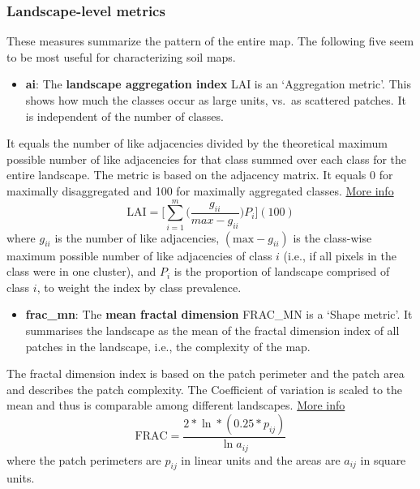 \documentclass[
  letterpaper,
  DIV=11,
  numbers=noendperiod]{scrartcl}
\providecommand{\tightlist}{%
  \setlength{\itemsep}{0pt}\setlength{\parskip}{0pt}}\usepackage{longtable,booktabs,array}
\begin{document}
\hypertarget{landscape-level-metrics}{%
\subsubsection{Landscape-level metrics}\label{landscape-level-metrics}}

These measures summarize the pattern of the entire map. The following
five seem to be most useful for characterizing soil maps.

\begin{itemize}
\tightlist
\item
  \textbf{ai}: The \textbf{landscape aggregation index} LAI is an
  `Aggregation metric'. This shows how much the classes occur as large
  units, vs.~as scattered patches. It is independent of the number of
  classes.
\end{itemize}

It equals the number of like adjacencies divided by the theoretical
maximum possible number of like adjacencies for that class summed over
each class for the entire landscape. The metric is based on the
adjacency matrix. It equals 0 for maximally disaggregated and 100 for
maximally aggregated classes.
\href{https://r-spatialecology.github.io/landscapemetrics/reference/lsm_l_ai.html}{More
info}
\[\mathrm{LAI} = \Bigg[∑_{i=1}^m \Big( \frac{g_{ii}}{max-g_{ii}} \Big) P_{i} \Bigg](100)\]
where \(g_{ii}\) is the number of like adjacencies,
\((\mathrm{max}-g_{ii})\) is the class-wise maximum possible number of
like adjacencies of class \(i\) (i.e., if all pixels in the class were
in one cluster), and \(P_{i}\) is the proportion of landscape comprised
of class \(i\), to weight the index by class prevalence.

\begin{itemize}
\tightlist
\item
  \textbf{frac\_mn}: The \textbf{mean fractal dimension} FRAC\_MN is a
  `Shape metric'. It summarises the landscape as the mean of the fractal
  dimension index of all patches in the landscape, i.e., the complexity
  of the map.
\end{itemize}

The fractal dimension index is based on the patch perimeter and the
patch area and describes the patch complexity. The Coefficient of
variation is scaled to the mean and thus is comparable among different
landscapes.
\href{https://r-spatialecology.github.io/landscapemetrics/reference/lsm_l_frac_mn.html}{More
info} \[\mathrm{FRAC} = \frac{2 * \ln * (0.25 * p_{ij})} {\ln a_{ij}}\]
where the patch perimeters are \({p_{ij}}\) in linear units and the
areas are \({a_{ij}}\) in square units.
\end{document}
